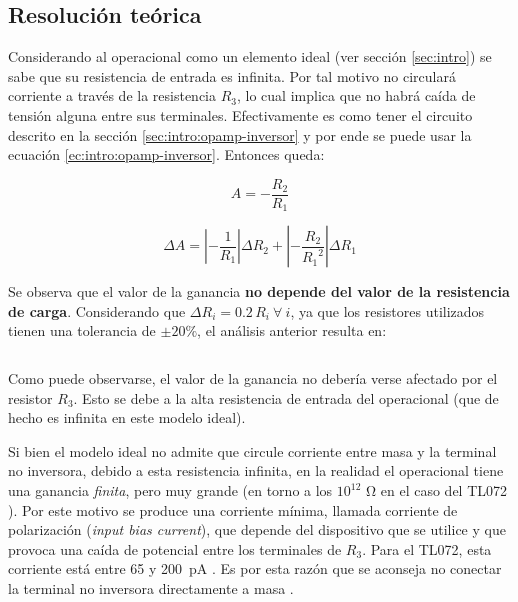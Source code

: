 \subsection{Resolución teórica}

Considerando al operacional como un elemento ideal (ver sección \ref{sec:intro})
se sabe que su resistencia de entrada es infinita. Por tal motivo no circulará
corriente a través de la resistencia $R_3$, lo cual implica que no habrá caída
de tensión alguna entre sus terminales. Efectivamente es como tener el circuito
descrito en la sección \ref{sec:intro:opamp-inversor} y por ende se puede usar
la ecuación \ref{ec:intro:opamp-inversor}. Entonces queda:

\begin{equation}
    \label{ec:1-teoria:ganancia}
    A = -\frac{R_2}{R_1}
\end{equation}

\begin{equation}
    \label{ec:1-teoria:err-ganancia}
    \Delta A = \left| - \frac{1}{R_1} \right| \Delta R_2
             + \left| - \frac{R_2}{{R_1}^2} \right| \Delta R_1
\end{equation}

Se observa que el valor de la ganancia \textbf{no depende del valor de la
resistencia de carga}. Considerando que $\Delta R_i = 0.2\,R_i\ \forall\ i$, ya
que los resistores utilizados tienen una tolerancia de $\pm 20\%$, el análisis
anterior resulta en:

\[
    
\]

Como puede observarse, el valor de la ganancia no debería verse afectado por el
resistor $R_3$. Esto se debe a la alta resistencia de entrada del operacional
(que de hecho es infinita en este modelo ideal).

Si bien el modelo ideal no admite que circule corriente entre masa y la
terminal no inversora, debido a esta resistencia infinita, en la realidad
el operacional tiene una ganancia \textit{finita}, pero muy grande (en torno a
los $10^{12}$ \si{\ohm} en el caso del TL072 \cite[pág. 5]{datasheet-tl072}).
Por este motivo se produce una corriente mínima, llamada corriente de
polarización (\textit{input bias current}), que depende del dispositivo que se
utilice y que provoca una caída de potencial entre los terminales de $R_3$.
Para el TL072, esta corriente está entre 65 y \SI{200}{\pico\ampere} 
\cite[pág. 5]{datasheet-tl072}. Es por esta razón que se aconseja no
conectar la terminal no inversora directamente a masa \cite[pág. 252]{AOE}.
